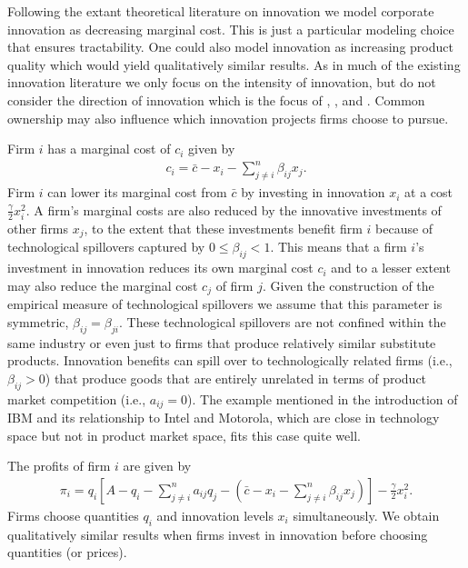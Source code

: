 \documentclass[12pt]{article}
\begin{document}
Following the extant theoretical literature on innovation \citep{daspremont1988,kamien1992,leahy1997,lopez2016cross} we model corporate innovation as decreasing marginal cost. This is just a particular modeling choice that ensures tractability. One could also model innovation as increasing product quality which would yield qualitatively similar results. As in much of the existing innovation literature we only focus on the intensity of innovation, but do not consider the direction of innovation which is the focus of \cite{letina2016road}, \cite{bryan2017direction}, and \cite{callander2021novelty}. Common ownership may also influence which innovation projects firms choose to pursue. 

Firm $i$ has a marginal cost of $c_{i}$ given by
\begin{align}
c_{i} = \bar{c} - x_{i} - \sum_{j \neq i}^{n} \beta_{ij} x_{j}.
\end{align}
Firm $i$ can lower its marginal cost from $\bar{c}$ by investing in innovation $x_{i}$ at a cost $\frac{\gamma}{2} x_{i}^2$. A firm's marginal costs are also reduced by the innovative investments of other firms $x_{j}$, to the extent that these investments benefit firm $i$ because of technological spillovers captured by $0 \leq \beta_{ij} < 1$. This means that a firm $i$'s investment in innovation reduces its own marginal cost $c_{i}$ and to a lesser extent may also reduce the marginal cost $c_{j}$ of firm $j$. Given the construction of the empirical measure of technological spillovers \citep{bloom2013} we assume that this parameter is symmetric, $\beta_{ij} = \beta_{ji}$. These technological spillovers are not confined within the same industry or even just to firms that produce relatively similar substitute products. Innovation benefits can spill over to technologically related firms (i.e., $\beta_{ij} > 0$) that produce goods that are entirely unrelated in terms of product market competition (i.e., $a_{ij} = 0$). The example mentioned in the introduction of IBM and its relationship to Intel and Motorola, which are close in technology space but not in product market space, fits this case quite well.  

The profits of firm $i$ are given by
\begin{align}
\pi_{i} = q_{i}\left[A - q_{i} -  \sum_{j \neq i}^{n} a_{ij} q_{j} - \left(\bar{c} - x_{i} - \sum_{j \neq i}^{n} \beta_{ij} x_{j}\right) \right] - \frac{\gamma}{2} x_{i}^2.
\end{align}
Firms choose quantities $q_{i}$ and innovation levels $x_{i}$ simultaneously. We obtain qualitatively similar results when firms invest in innovation before choosing quantities (or prices).
\end{document}
